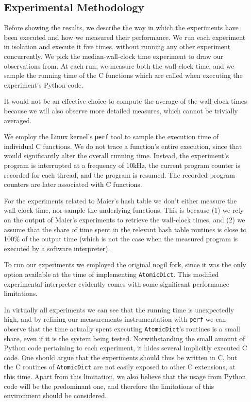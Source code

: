 \subsection{Experimental Methodology}\label{subsec:methodology}

Before showing the results, we describe the way in which the experiments have been executed and how we measured their performance.
We run each experiment in isolation and execute it five times, without running any other experiment concurrently.
We pick the median-wall-clock time experiment to draw our observations from.
At each run, we measure both the wall-clock time, and we sample the running time of the C functions which are called when executing the experiment's Python code.

It would not be an effective choice to compute the average of the wall-clock times because we will also observe more detailed measures, which cannot be trivially averaged.

We employ the Linux kernel's \texttt{perf} tool to sample the execution time of individual C functions.
We do not trace a function's entire execution, since that would significantly alter the overall running time.
Instead, the experiment's program is interrupted at a frequency of 10{kHz}, the current program counter is recorded for each thread, and the program is resumed.
The recorded program counters are later associated with C functions.

For the experiments related to Maier's hash table we don't either measure the wall-clock time, nor sample the underlying functions.
This is because (1) we rely on the output of Maier's experiments to retrieve the wall-clock times, and (2) we assume that the share of time spent in the relevant hash table routines is close to 100\% of the output time (which is not the case when the measured program is executed by a software interpreter).

To run our experiments we employed the original nogil fork, since it was the only option available at the time of implementing \texttt{AtomicDict}.
This modified experimental interpreter evidently comes with some significant performance limitations.

In virtually all experiments we can see that the running time is unexpectedly high, and by refining our measurements instrumentation with \texttt{perf} we can observe that the time actually spent executing \texttt{AtomicDict}'s routines is a small share, even if it is the system being tested.
Notwithstanding the small amount of Python code pertaining to each experiment, it hides several implicitly executed C code.
One should argue that the experiments should thus be written in C, but the C routines of \texttt{AtomicDict} are not easily exposed to other C extensions, at this time.
Apart from this limitation, we also believe that the usage from Python code will be the predominant one, and therefore the limitations of this environment should be considered.

